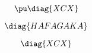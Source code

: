 \documentclass[oneside]{article}
\begin{document}
\savebox\hafagaka{\theverbbox}




\begin{verbbox}
$$\pu
  \diag{XCX}
$$
\end{verbbox}

\savebox\xcx{\theverbbox}


\fbox{\resizebox{0.4\textwidth}{!}{\usebox{\hafagaka}}}
\fbox{\resizebox{0.4\textwidth}{!}{\usebox{\xcx}}}

\pu
$$\diag{HAFAGAKA}
$$

$$  \diag{XCX}
$$
\end{document}
